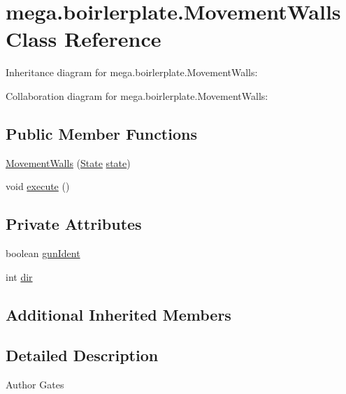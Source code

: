 \hypertarget{classmega_1_1boirlerplate_1_1_movement_walls}{}\section{mega.\+boirlerplate.\+Movement\+Walls Class Reference}
\label{classmega_1_1boirlerplate_1_1_movement_walls}


Inheritance diagram for mega.\+boirlerplate.\+Movement\+Walls\+:


Collaboration diagram for mega.\+boirlerplate.\+Movement\+Walls\+:
\subsection*{Public Member Functions}
\begin{DoxyCompactItemize}
\item 
\hyperlink{classmega_1_1boirlerplate_1_1_movement_walls_a5cae772481f48d33274bc7ac30a5597c}{Movement\+Walls} (\hyperlink{classmega_1_1boirlerplate_1_1_state}{State} \hyperlink{classmega_1_1boirlerplate_1_1_component_a87b0d70f323b5fee60a200e07c9c20fd}{state})
\item 
void \hyperlink{classmega_1_1boirlerplate_1_1_movement_walls_a286a113f200e75f76dd6e51010f0593c}{execute} ()
\end{DoxyCompactItemize}
\subsection*{Private Attributes}
\begin{DoxyCompactItemize}
\item 
boolean \hyperlink{classmega_1_1boirlerplate_1_1_movement_walls_a621ded8f3c9534eeb83cc84a5da7a073}{gun\+Ident}
\item 
int \hyperlink{classmega_1_1boirlerplate_1_1_movement_walls_a0fe9185ce9bcf6ec62923ac2ef0f7704}{dir}
\end{DoxyCompactItemize}
\subsection*{Additional Inherited Members}


\subsection{Detailed Description}
\begin{DoxyAuthor}{Author}
Gates 
\end{DoxyAuthor}


